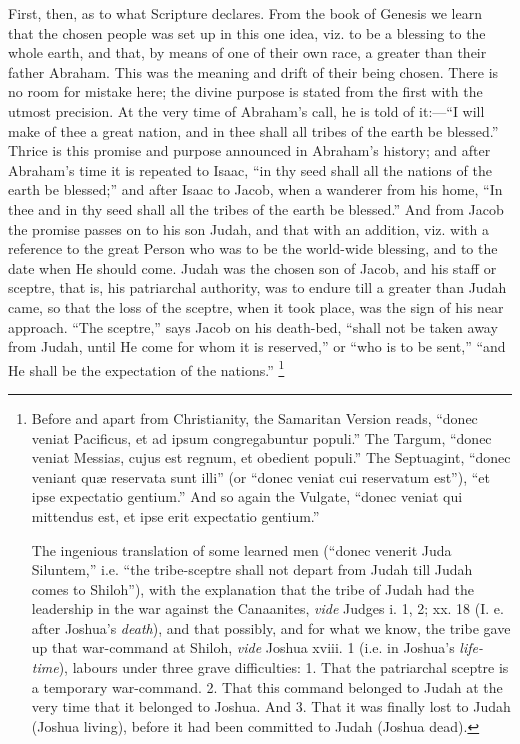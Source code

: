 First, then, as to what Scripture declares. From the book of
Genesis we learn that the chosen people was set up in this one idea,
viz. to be a blessing to the whole earth, and that, by means of one of
their own race, a greater than their father Abraham. This was the
meaning and drift of their being chosen. There is no room for mistake
here; the divine purpose is stated from the first with the utmost
precision. At the very time of Abraham's call, he is told of it:—``I
will make of thee a great nation, and in thee shall all tribes
of the earth be blessed.'' Thrice is this promise and purpose
announced in Abraham's history; and after Abraham's time it is
repeated to Isaac, ``in thy seed shall all the nations of the
earth be blessed;'' and after Isaac to Jacob, when a wanderer from
his home, ``In thee and in thy seed shall all the tribes of the
earth be blessed.'' And from Jacob the promise passes on to his
son Judah, and that with an addition, viz. with a reference to the
great Person who was to be the world-wide blessing, and to the date
when He should come. Judah was the chosen son of Jacob, and his staff
or sceptre, that is, his patriarchal authority, was to endure till a
greater than Judah came, so that the loss of the sceptre, when it took
place, was the sign of his near approach. ``The sceptre,''
says Jacob on his death-bed, ``shall not be taken away from Judah,
until He come for whom it is reserved,'' or ``who is to be
sent,'' ``and He shall be the expectation of the
nations.'' \footnote{Before and
apart from Christianity, the Samaritan Version reads, ``donec
veniat Pacificus, et ad ipsum congregabuntur populi.'' The Targum,
``donec veniat Messias, cujus est regnum, et obedient populi.''
The Septuagint, ``donec veniant quæ reservata sunt illi'' (or
``donec veniat cui reservatum est''), ``et ipse expectatio
gentium.'' And so again the Vulgate, ``donec veniat qui
mittendus est, et ipse erit expectatio gentium.''

The ingenious translation of some learned men (``donec venerit
Juda Siluntem,'' i.e. ``the tribe-sceptre shall not depart
from Judah till Judah comes to Shiloh''), with the explanation
that the tribe of Judah had the leadership in the war against the
Canaanites, \emph{vide} Judges i. 1, 2; xx. 18 (I. e. after Joshua's \emph{death}),
and that possibly, and for what we know, the tribe gave up that
war-command at Shiloh, \emph{vide} Joshua xviii. 1 (i.e. in Joshua's \emph{life-time}),
labours under three grave difficulties: 1. That the patriarchal
sceptre is a temporary war-command. 2. That this command belonged to
Judah at the very time that it belonged to Joshua. And 3. That it was
finally lost to Judah (Joshua living), before it had been committed to
Judah (Joshua dead).}

